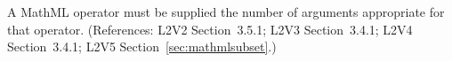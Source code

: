 A MathML operator must be supplied the number of arguments appropriate for
that operator.  (References: L2V2 Section~3.5.1; L2V3 Section~3.4.1; L2V4 Section~3.4.1; 
L2V5 Section~\ref{sec:mathmlsubset}.)
